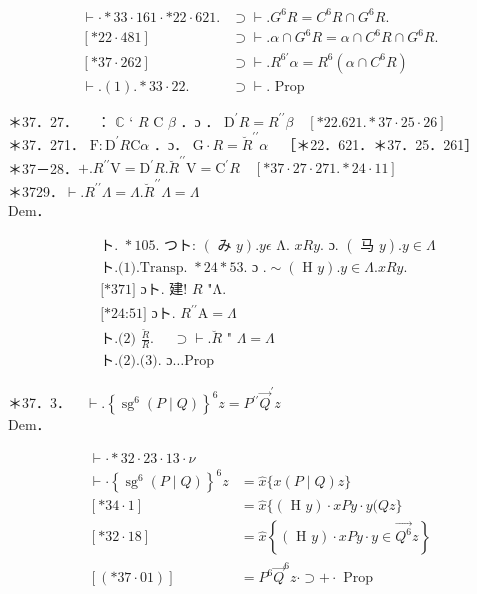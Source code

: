 \documentclass[10pt]{article}
\begin{document}
\[
\begin{array}{ll}
\vdash \cdot * 33 \cdot 161 \cdot * 22 \cdot 621 . & \supset \vdash . G^{6} R=C^{6} R \cap G^{6} R . \\
{[* 22 \cdot 481]} & \supset \vdash . \alpha \cap G^{6} R=\alpha \cap C^{6} R \cap G^{6} R . \\
{[* 37 \cdot 262]} & \supset \vdash . R^{6 \prime} \alpha=R^{6}\left(\alpha \cap C^{6} R\right)  \tag{1}\\
\vdash .(1) . * 33 \cdot 22 . & \supset \vdash . \text { Prop }
\end{array}
\]

＊37．27．$\quad$ ： $\mathbb{C}$ ‘ $R$ C $\beta$ ．ɔ ． $\mathrm{D}^{\prime} R=R^{\prime \prime} \beta \quad[* 22.621 . * 37 \cdot 25 \cdot 26]$\\
＊37．271． $\mathrm{F}: \mathrm{D}^{\prime} R \mathrm{C} \alpha$ ．ɔ． $\mathrm{G} \cdot R=\breve{R}^{\prime \prime} \alpha \quad$［＊22．621．＊37．25．261］\\
＊37－28．$+. R^{\prime \prime} \mathrm{V}=\mathrm{D}^{\prime} R . \breve{R}^{\prime \prime} \mathrm{V}=\mathrm{C}^{\prime} R \quad[* 37 \cdot 27 \cdot 271 . * 24 \cdot 11]$\\
＊3729．$\vdash . R^{\prime \prime} \Lambda=\Lambda . \breve{R}^{\prime \prime} \Lambda=\Lambda$\\
Dem．


\begin{align*}
& \text { ト. } * 105 . \text { つト: }(\text { み } y) . y \epsilon \text { Λ. } x R y . \text { ɔ. }(\text { 马 } y) . y \in \Lambda  \tag{1}\\
& \text { ト.(1).Transp. } * 24 * 53 \text {. ɔ } . \sim(\text { H } y) . y \in \Lambda . x R y \text {. } \\
& \text { [*371] ɔト.~建! } R \text { "Λ. } \\
& \text { [*24:51] ɔト. } R^{\prime \prime} \mathrm{A}=\Lambda  \tag{2}\\
& \text { ト.(2) } \frac{\breve{R}}{R} \text {. } \quad \supset \vdash . \breve{R} \text { " } \Lambda=\Lambda  \tag{3}\\
& \text { ト.(2).(3). ɔ…Prop }
\end{align*}


＊37．3．$\quad \vdash .\left\{\operatorname{sg}^{6}(P \mid Q)\right\}^{6} z=P{ }^{\prime \prime} \vec{Q}^{\prime} z$\\
Dem．

$$
\begin{array}{ll}
\vdash \cdot * 32 \cdot 23 \cdot 13 \cdot \nu & \\
\vdash \cdot\left\{\operatorname{sg}^{6}(P \mid Q)\right\}^{6} z & =\widehat{x}\{x(P \mid Q) z\} \\
{[* 34 \cdot 1]} & =\widehat{x}\{(\text { H } y) \cdot x P y \cdot y(Q z\} \\
{[* 32 \cdot 18]} & =\widehat{x}\left\{(\text { H } y) \cdot x P y \cdot y \in \overrightarrow{Q^{6}} z\right\} \\
{[(* 37 \cdot 01)]} & =P^{6} \vec{Q}^{6} z \cdot \supset+\cdot \text { Prop }
\end{array}
$$
\end{document}
